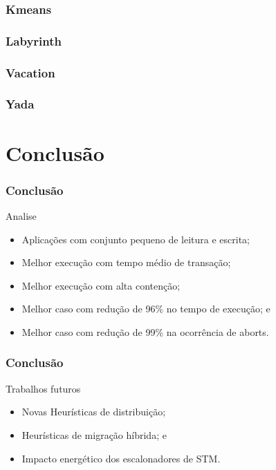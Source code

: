 \documentclass[10pt, pdf,xcolor=pdftex,dvipsnames,table]{beamer}
\begin{document}
\begin{frame} \frametitle{Kmeans}
    
\end{frame}

\begin{frame} \frametitle{Labyrinth}
    
\end{frame}

\begin{frame} \frametitle{Vacation}
    
\end{frame}

\begin{frame} \frametitle{Yada}
    
\end{frame}

\section{Conclusão}
\begin{frame} \frametitle{Conclusão}
    \begin{block}{Analise}
        \begin{itemize}
        	\item Aplicações com conjunto pequeno de leitura e escrita;
        	\item Melhor execução com tempo médio de transação;
        	\item Melhor execução com alta contenção;
        	\item Melhor caso com redução de 96\% no tempo de execução; e
        	\item Melhor caso com redução de 99\% na ocorrência de aborts.
        \end{itemize}
    \end{block}
\end{frame}

\begin{frame} \frametitle{Conclusão}
    \begin{block}{Trabalhos futuros}
        \begin{itemize}
        	\item Novas Heurísticas de distribuição;
        	\item Heurísticas de migração híbrida; e
        	\item Impacto energético dos escalonadores de STM.
        \end{itemize}
    \end{block}
\end{frame}

\maketitle
\end{document}
